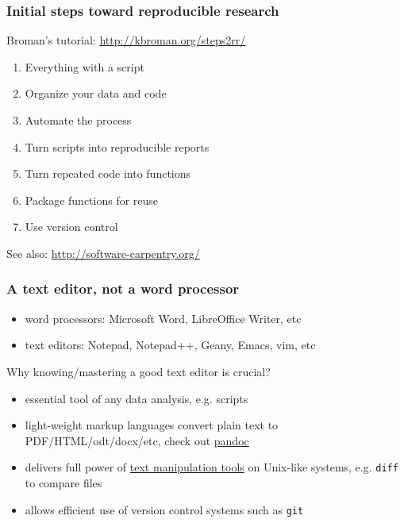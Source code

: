 \documentclass[c]{beamer} %
\begin{document}
  
  

\begin{frame}
  \frametitle{Initial steps toward reproducible research}
  Broman's tutorial: \url{http://kbroman.org/steps2rr/}
  
  \bigskip
  
  \begin{enumerate}
  \item Everything with a script
  \item Organize your data and code
  \item Automate the process
  \item Turn scripts into reproducible reports
  \item Turn repeated code into functions
  \item Package functions for reuse
  \item Use version control
  \end{enumerate}
  
  \bigskip
  \pause
  
  See also: \url{http://software-carpentry.org/}
\end{frame}

\begin{frame}[fragile]
  \frametitle{A text editor, not a word processor}
  \begin{itemize}
  \item word processors: Microsoft Word, LibreOffice Writer, etc
  \item text editors: Notepad, Notepad++, Geany, Emacs, vim, etc
  \end{itemize}
  
  \bigskip
  \pause
  
  Why \alert{knowing/mastering a good text editor is crucial}?
  \begin{itemize}
  \item essential tool of any data analysis, e.g. scripts
  \item light-weight markup languages convert plain text to PDF/HTML/odt/docx/etc, check out \href{http://johnmacfarlane.net/pandoc/}{pandoc}
  \item delivers full power of \href{http://www.ibm.com/developerworks/aix/library/au-unixtext/index.html}{text manipulation tools} on Unix-like systems, e.g. \verb+diff+ to compare files
  \item allows efficient use of version control systems such as \verb+git+
  \end{itemize}
\end{frame}
\end{document}
